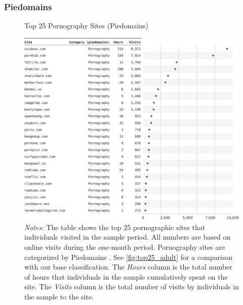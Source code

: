 \documentclass[12pt,twoside]{article}
\begin{document}
\subsubsection{Piedomains}
\begin{figure}[!ht]
	\centering
	\caption{Top 25 Pornography Sites (Piedomains)}
	\includegraphics[width=\textwidth]{figs/top_25_adultsites_piedomains.pdf}
	\caption*{\footnotesize \emph{Notes:} 
		The table shows the top 25 pornographic sites that individuals visited in the sample period.
            All numbers are based on online visits during the one-month period.
		Pornography sites are categorized by Piedomains \citep{Chintalapati_piedomains_Predict_the_2022}.
            See \cref{fig:top25_adult} for a comparison with our base classification.
    	The \emph{Hours} column is the total number of hours that individuals in the sample cumulatively spent on the site. 
    	The \emph{Visits} column is the total number of visits by individuals in the sample to the site.            
	}
	\label{fig:top25_adult_piedomains}
\end{figure}
\end{document}
